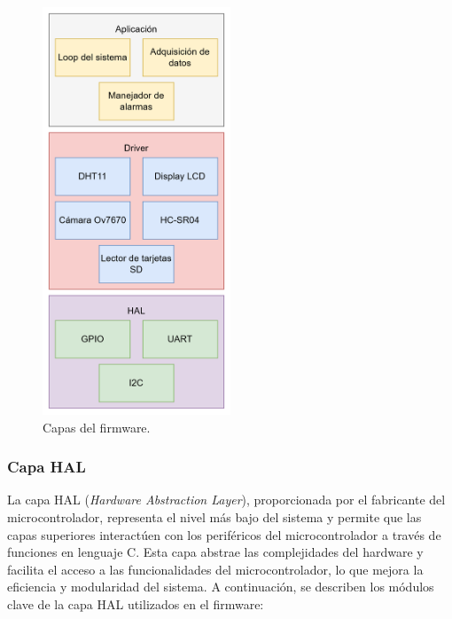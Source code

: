 \vspace{1cm}

\begin{figure}[htbp]
	\centering
	\includegraphics[width=0.5\textwidth, height=0.7\textheight]{./Figures/firmware_general.png}
	\caption{Capas del firmware.}
	\label{fig:firmware_general}
\end{figure}

\vspace{1cm}

\subsubsection{Capa HAL}

La capa HAL (\textit{Hardware Abstraction Layer}), proporcionada por el fabricante del microcontrolador, representa el nivel más bajo del sistema y permite que las capas superiores interactúen con los periféricos del microcontrolador a través de funciones en lenguaje C. Esta capa abstrae las complejidades del hardware y facilita el acceso a las funcionalidades del microcontrolador, lo que mejora la eficiencia y modularidad del sistema. A continuación, se describen los módulos clave de la capa HAL utilizados en el firmware:

